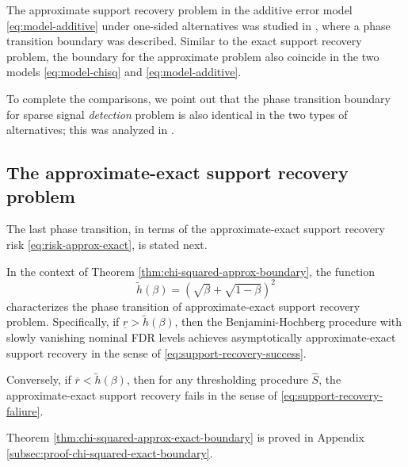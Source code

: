 \begin{remark} \label{rmk:weak-classification-boundary}
The approximate support recovery problem in the additive error model \eqref{eq:model-additive} under one-sided alternatives was studied in \cite{arias2017distribution}, where a phase transition boundary was described.
Similar to the exact support recovery problem, the boundary for the approximate problem also coincide in the two models \eqref{eq:model-chisq} and \eqref{eq:model-additive}.

To complete the comparisons, we point out that the phase transition boundary for sparse signal \emph{detection} problem is also identical in the two types of alternatives; this was analyzed in \cite{donoho2004higher}.
\end{remark}


\subsection{The approximate-exact support recovery problem}

The last phase transition, in terms of the approximate-exact support recovery risk
\eqref{eq:risk-approx-exact}, is stated next.

\begin{theorem} \label{thm:chi-squared-approx-exact-boundary}
In the context of Theorem \ref{thm:chi-squared-approx-boundary}, the function 
\begin{equation} \label{eq:approx-exact-boundary-chisquared}
    \widetilde{h}(\beta) = \left(\sqrt{\beta} + \sqrt{1-\beta}\right)^2
\end{equation}
characterizes the phase transition of approximate-exact support recovery problem.
Specifically, if $\underline{r} > \widetilde{h}(\beta)$, then the Benjamini-Hochberg procedure with slowly vanishing nominal FDR levels achieves asymptotically approximate-exact support recovery in the sense of \eqref{eq:support-recovery-success}. 

Conversely, if $\overline{r} < \widetilde{h}(\beta)$, then for any thresholding procedure $\widehat{S}$, the approximate-exact support recovery fails in the sense of \eqref{eq:support-recovery-faliure}.
\end{theorem}

Theorem \ref{thm:chi-squared-approx-exact-boundary} is proved in Appendix \ref{subsec:proof-chi-squared-exact-boundary}. 

